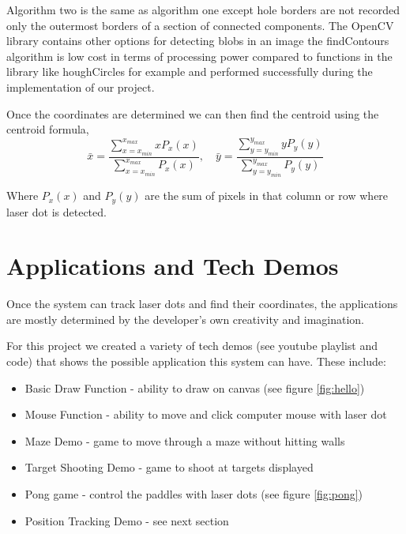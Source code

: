\documentclass[a4paper]{article}
\begin{document}
Algorithm two is the same as algorithm one except hole borders are not recorded only the outermost borders of a section of connected components. The OpenCV library contains other options for detecting blobs in an image the findContours algorithm is low cost in terms of processing power compared to functions in the library like houghCircles for example and performed successfully during the implementation of our project. 

Once the coordinates are determined we can then find the centroid using the centroid formula,
\begin{equation}
\bar{x} = \frac{\sum\limits_{x = x_{min}}^{x_{max}}{x P_x(x)}}{\sum\limits_{x = x_{min}}^{x_{max}}{P_x(x)}}, \quad
\bar{y} = \frac{\sum\limits_{y = y_{min}}^{y_{max}}{y P_y(y)}}{\sum\limits_{y = y_{min}}^{y_{max}}{P_y(y)}}
\end{equation}

Where $P_x(x)$ and $P_y(y)$ are the sum of pixels in that column or row where laser dot is detected. 

\section{Applications and Tech Demos}
Once the system can track laser dots and find their coordinates, the applications are mostly determined by the developer's own creativity and imagination. 

For this project we created a variety of tech demos (see youtube playlist \cite{techDemos} and code) that shows the possible application this system can have. These include:

\begin{itemize}
	\item Basic Draw Function - ability to draw on canvas (see figure \ref{fig:hello})
	\item Mouse Function - ability to move and click computer mouse with laser dot
	\item Maze Demo - game to move through a maze without hitting walls
	\item Target Shooting Demo - game to shoot at targets displayed
	\item Pong game - control the paddles with laser dots (see figure \ref{fig:pong})
	\item Position Tracking Demo - see next section

\end{itemize}
\end{document}
